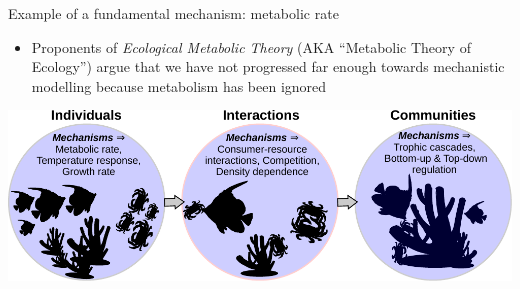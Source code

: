 \documentclass[xcolor=x11names,compress]{beamer}
\renewcommand{\(}{\begin{columns}}
\renewcommand{\)}{\end{columns}}
\newcommand{\<}[1]{\begin{column}{#1}}
\renewcommand{\>}{\end{column}}
\begin{document}
\begin{frame}{Example of a fundamental mechanism: metabolic rate}

	\begin{itemize}
		\item Proponents of {\it Ecological Metabolic Theory} (AKA ``Metabolic Theory of Ecology'') argue that we have not progressed far enough towards mechanistic modelling because metabolism has been ignored
	\end{itemize}

	\begin{center}
		\includegraphics[width=\textwidth]{Mechanisms.pdf}
	\end{center} 	

\end{frame}
\end{document}
